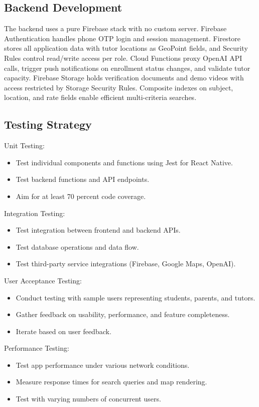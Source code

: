 \documentclass[12pt]{report}
\begin{document}
\subsection{Backend Development}

The backend uses a pure Firebase stack with no custom server. Firebase Authentication handles phone OTP login and session management. Firestore stores all application data with tutor locations as GeoPoint fields, and Security Rules control read/write access per role. Cloud Functions proxy OpenAI API calls, trigger push notifications on enrollment status changes, and validate tutor capacity. Firebase Storage holds verification documents and demo videos with access restricted by Storage Security Rules. Composite indexes on subject, location, and rate fields enable efficient multi-criteria searches.

\subsection{Testing Strategy}

Unit Testing:
\begin{itemize}
\item Test individual components and functions using Jest for React Native.
\item Test backend functions and API endpoints.
\item Aim for at least 70 percent code coverage.
\end{itemize}

\noindent Integration Testing:
\begin{itemize}
\item Test integration between frontend and backend APIs.
\item Test database operations and data flow.
\item Test third-party service integrations (Firebase, Google Maps, OpenAI).
\end{itemize}

\noindent User Acceptance Testing:
\begin{itemize}
\item Conduct testing with sample users representing students, parents, and tutors.
\item Gather feedback on usability, performance, and feature completeness.
\item Iterate based on user feedback.
\end{itemize}

\noindent Performance Testing:
\begin{itemize}
\item Test app performance under various network conditions.
\item Measure response times for search queries and map rendering.
\item Test with varying numbers of concurrent users.
\end{itemize}
\end{document}
